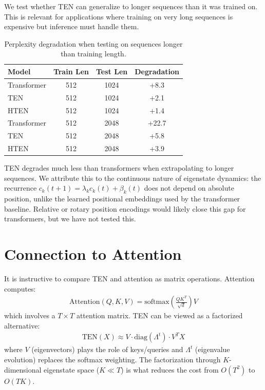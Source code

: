 \documentclass{article}
\begin{document}
We test whether TEN can generalize to longer sequences than it was trained on. This is relevant for applications where training on very long sequences is expensive but inference must handle them.

\begin{table}[h]
\centering
\caption{Perplexity degradation when testing on sequences longer than training length.}
\label{tab:ood}
\begin{tabular}{lccc}
\toprule
Model & Train Len & Test Len & Degradation \\
\midrule
Transformer & 512 & 1024 & +8.3 \\
TEN & 512 & 1024 & +2.1 \\
HTEN & 512 & 1024 & +1.4 \\
\midrule
Transformer & 512 & 2048 & +22.7 \\
TEN & 512 & 2048 & +5.8 \\
HTEN & 512 & 2048 & +3.9 \\
\bottomrule
\end{tabular}
\end{table}

TEN degrades much less than transformers when extrapolating to longer sequences. We attribute this to the continuous nature of eigenstate dynamics: the recurrence $c_k(t+1) = \lambda_k c_k(t) + \beta_k(t)$ does not depend on absolute position, unlike the learned positional embeddings used by the transformer baseline. Relative or rotary position encodings would likely close this gap for transformers, but we have not tested this.


\section{Connection to Attention}
\label{app:attention}

It is instructive to compare TEN and attention as matrix operations. Attention computes:
\begin{align}
\text{Attention}(Q, K, V) = \text{softmax}\left(\frac{QK^T}{\sqrt{d}}\right) V
\end{align}
which involves a $T \times T$ attention matrix. TEN can be viewed as a factorized alternative:
\begin{align}
\text{TEN}(X) \approx V \cdot \text{diag}(\Lambda^t) \cdot V^T X
\end{align}
where $V$ (eigenvectors) plays the role of keys/queries and $\Lambda^t$ (eigenvalue evolution) replaces the softmax weighting. The factorization through $K$-dimensional eigenstate space ($K \ll T$) is what reduces the cost from $O(T^2)$ to $O(TK)$.
\end{document}
